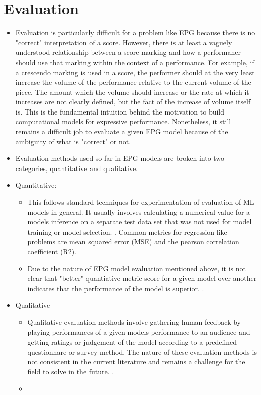 \section{Evaluation}
\begin{itemize}
    \item Evaluation is particularly difficult for a problem like EPG because there is no "correct" interpretation of a score. However, there is at least a vaguely understood relationship between a score marking and how a performaner should use that marking within the context of a performance. For example, if a crescendo marking is used in a score, the performer should at the very least increase the volume of the performance relative to the current volume of the piece. The amount which the volume should increase or the rate at which it increases are not clearly defined, but the fact of the increase of volume itself is. This is the fundamental intuition behind the motivation to build computational models for expressive performance. Nonetheless, it still remains a difficult job to evaluate a given EPG model because of the ambiguity of what is "correct" or not.
    \item Evaluation methods used so far in EPG models are broken into two categories, quantitative and qualitative. 
    \item Quantitative: 
    \begin{itemize}
        \item This follows standard techniques for experimentation of evaluation of ML models in general. It usually involves calculating a numerical value for a models inference on a separate test data set that was not used for model training or model selection. . Common metrics for regression like problems are mean squared error (MSE) and the pearson correlation coefficient (R2). 
        \item Due to the nature of EPG model evaluation mentioned above, it is not clear that "better" quantiative metric score for a given model over another indicates that the performance of the model is superior. . 
    \end{itemize}
    \item Qualitative
    \begin{itemize}
        \item Qualitative evaluation methods involve gathering human feedback by playing performances of a given models performance to an audience and getting ratings or judgement of the model according to a predefined questionnare or survey method. The nature of these evaluation methods is not consistent in the current literature and remains a challenge for the field to solve in the future. . 
        \item {}
    \end{itemize}
\end{itemize}



